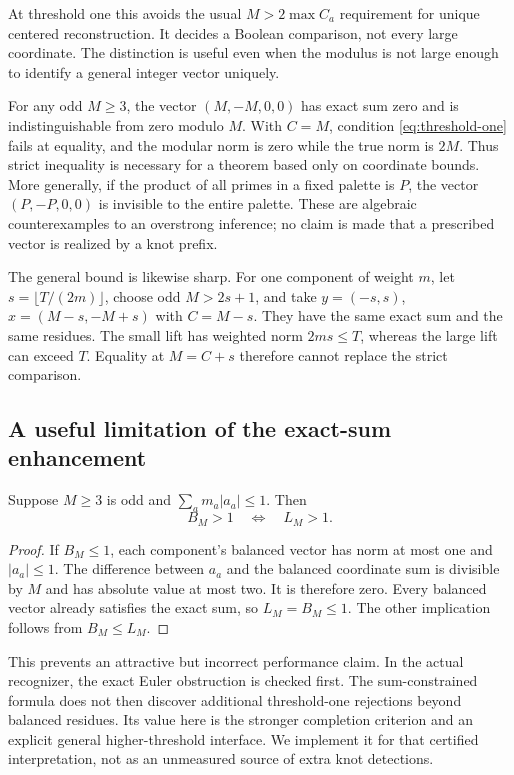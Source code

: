 At threshold one this avoids the usual $M>2\max C_a$ requirement for
unique centered reconstruction. It decides a Boolean comparison, not every
large coordinate. The distinction is useful even when the modulus is not large
enough to identify a general integer vector uniquely.

\begin{example}
For any odd $M\ge3$, the vector $(M,-M,0,0)$ has exact sum zero and is
indistinguishable from zero modulo $M$. With $C=M$, condition
\cref{eq:threshold-one} fails at equality, and the modular norm is zero while
the true norm is $2M$. Thus strict inequality is necessary for a theorem based
only on coordinate bounds. More generally, if the product of all primes in a
fixed palette is $P$, the vector $(P,-P,0,0)$ is invisible to the entire palette.
These are algebraic counterexamples to an overstrong inference; no claim is
made that a prescribed vector is realized by a knot prefix.
\end{example}

The general bound is likewise sharp. For one component of weight $m$, let
$s=\lfloor T/(2m)\rfloor$, choose odd $M>2s+1$, and take
$y=(-s,s)$, $x=(M-s,-M+s)$ with $C=M-s$. They have the same exact sum and
the same residues. The small lift has weighted norm $2ms\le T$, whereas
the large lift can exceed $T$. Equality at $M=C+s$ therefore cannot replace
the strict comparison.

\subsection{A useful limitation of the exact-sum enhancement}

\begin{proposition}
\label{prop:redundancy}
Suppose $M\ge3$ is odd and $\sum_a m_a|a_a|\le1$. Then
\[
                         B_M>1\quad\Longleftrightarrow\quad L_M>1.
\]
\end{proposition}
\begin{proof}
If $B_M\le1$, each component's balanced vector has norm at most one and
$|a_a|\le1$. The difference between $a_a$ and the balanced coordinate sum
is divisible by $M$ and has absolute value at most two. It is therefore zero.
Every balanced vector already satisfies the exact sum, so $L_M=B_M\le1$.
The other implication follows from $B_M\le L_M$.
\end{proof}

This prevents an attractive but incorrect performance claim. In the actual
recognizer, the exact Euler obstruction is checked first. The sum-constrained
formula does not then discover additional threshold-one rejections beyond
balanced residues. Its value here is the stronger completion criterion and
an explicit general higher-threshold interface. We implement it for that
certified interpretation, not as an unmeasured source of extra knot detections.


